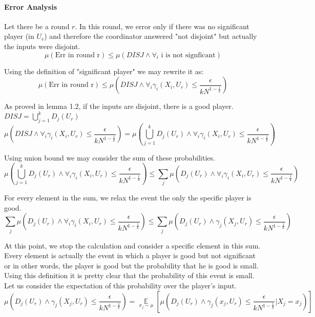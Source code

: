 \documentclass{article}
\theoremstyle{plain}
\begin{document}
\paragraph{Error Analysis}
Let there be a round $r$. In this round, we error only if there was no significant player (in $U_r$) and therefore the coordinator answered "not disjoint" but actually the inputs were disjoint.
\begin{equation*}
  \mu(\text{Err in round r}) \leq \mu(DISJ \land \forall_i \text{ i is not signficant})
\end{equation*}

Using the definition of "significant player" we may rewrite it as:
\begin{equation*}
  \mu(\text{Err in round r}) \leq \mu(DISJ \land \forall_i \gamma_i(X_i, U_r) \leq \frac{\epsilon}{kN^{1-\frac{1}{k}}})
\end{equation*}

As proved in lemma 1.2, if the inputs are disjoint, there is a good player. $DISJ = \bigcup_{j = 1}^k D_j(U_r)$ 
\begin{equation*}
  \mu(DISJ \land \forall_i \gamma_i(X_i, U_r) \leq \frac{\epsilon}{kN^{1-\frac{1}{k}}}) = \mu(\bigcup_{j = 1}^k D_j(U_r) \land \forall_i \gamma_i(X_i, U_r) \leq \frac{\epsilon}{kN^{1-\frac{1}{k}}})
\end{equation*}

Using union bound we may consider the sum of these probabilities.
\begin{equation*}
  \mu(\bigcup_{j = 1}^k D_j(U_r) \land \forall_i \gamma_i(X_i, U_r) \leq \frac{\epsilon}{kN^{1-\frac{1}{k}}}) \leq \sum_j \mu(D_j(U_r) \land \forall_i \gamma_i(X_i, U_r) \leq \frac{\epsilon}{kN^{1-\frac{1}{k}}})
\end{equation*}

For every element in the sum, we relax the event the only the specific player is good.
\begin{equation*}
  \sum_j \mu(D_j(U_r) \land \forall_i \gamma_i(X_i, U_r) \leq \frac{\epsilon}{kN^{1-\frac{1}{k}}}) \leq \sum_j \mu(D_j(U_r) \land \gamma_j(X_j, U_r) \leq \frac{\epsilon}{kN^{1-\frac{1}{k}}})
\end{equation*}

At this point, we stop the calculation and consider a specific element in this sum. Every element is actually the event in which a player is good but not significant or in other words, the player is good but the probability that he is good is small. Using this definition it is pretty clear that the probability of this event is small. \newline
Let us consider the expectation of this probability over the player's input.
\begin{equation*}
  \mu(D_j(U_r) \land \gamma_j(X_j, U_r) \leq \frac{\epsilon}{kN^{1-\frac{1}{k}}}) = \underset{x_j \sim \mu}{\mathop{\mathbb{E}}}[\mu(D_j(U_r) \land \gamma_j(x_j, U_r) \leq \frac{\epsilon}{kN^{1-\frac{1}{k}}} | X_j = x_j)]
\end{equation*}
\end{document}
